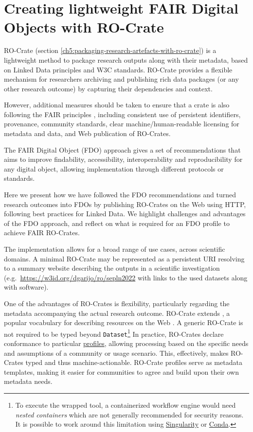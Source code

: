 \section{Creating lightweight FAIR Digital Objects with RO-Crate}
\label{ch4:lightweight-fdo}

RO-Crate \cite{Soiland-Reyes 2022} (section \ref{ch5:packaging-research-artefacts-with-ro-crate}) 
is a lightweight method to package research outputs along with
their metadata, based on Linked Data principles
\cite{Bizer 2009} and
W3C standards. RO-Crate provides a flexible mechanism for researchers
archiving and publishing rich data packages (or any other research
outcome) by capturing their dependencies and context.

However, additional measures should be taken to ensure that a crate is
also following the FAIR principles
\cite{Wilkinson 2016},
including consistent use of persistent identifiers, provenance,
community standards, clear machine/human-readable licensing for metadata
and data, and Web publication of RO-Crates.

The FAIR Digital Object (FDO) approach
\cite{De Smedt 2020}
gives a set of recommendations that aims to improve findability,
accessibility, interoperability and reproducibility for any digital
object, allowing implementation through different protocols or
standards.

Here we present how we have followed the FDO recommendations and turned
research outcomes into FDOs by publishing RO-Crates on the Web using
HTTP, following best practices for Linked Data. We highlight challenges
and advantages of the FDO approach, and reflect on what is required for
an FDO profile to achieve FAIR RO-Crates.

The implementation allows for a broad range of use cases, across
scientific domains. A minimal RO-Crate may be represented as a
persistent URI resolving to a summary website describing the outputs in
a scientific investigation
(e.g.~\url{https://w3id.org/dgarijo/ro/sepln2022} with links to the used
datasets along with software).

One of the advantages of RO-Crates is flexibility, particularly
regarding the metadata accompanying the actual research outcome.
RO-Crate extends \cite{schema.org}, a popular
vocabulary for describing resources on the Web
\cite{Guha 2016}. A generic
RO-Crate is not required to be typed beyond \texttt{Dataset}\footnote{To
  execute the wrapped tool, a containerized workflow engine would need
  \emph{nested containers} which are not generally recommended for
  security reasons. It is possible to work around this limitation using
  \href{https://sylabs.io/singularity/}{Singularity} or
  \href{https://docs.bioexcel.eu/cwl-best-practice-guide/devpractice/containers/conda.html}{Conda}.}
In practice, RO-Crates declare conformance to particular
\href{https://www.researchobject.org/ro-crate/profiles.html}{profiles},
allowing processing based on the specific needs and assumptions of a
community or usage scenario. This, effectively, makes RO-Crates typed
and thus machine-actionable. RO-Crate profiles serve as metadata
templates, making it easier for communities to agree and build upon
their own metadata needs.

